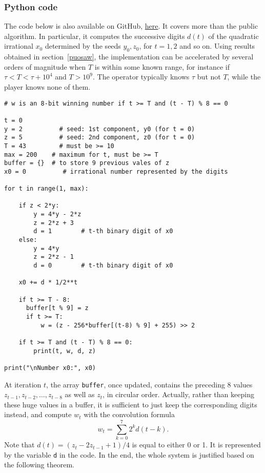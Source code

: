 \documentclass[oneside,10pt]{book}
\begin{document}
\subsubsection{Python code}\label{bornase}

The code below is also available on GitHub, \href{https://github.com/VincentGranville/Stochastic-Processes/blob/master/lottery.py}{here}.
 It covers more than the public algorithm. In particular, it computes the successive digits $d(t)$ of
 the quadratic irrational $x_0$ determined by the seeds $y_0,z_0$, for $t=1,2$ and so on.
 Using results obtained in section~\ref{puosaw}, the implementation can be accelerated by several orders of magnitude
 when $T$ is within some known range, for instance if $\tau < T < \tau +10^4$ and $T>10^9$.
The operator typically knows $\tau$ but not $T$, while the player knows none of them.
\vspace{1ex}

\begin{lstlisting}
# w is an 8-bit winning number if t >= T and (t - T) % 8 == 0

t = 0
y = 2          # seed: 1st component, y0 (for t = 0)
z = 5          # seed: 2nd component, z0 (for t = 0)
T = 43         # must be >= 10
max = 200    # maximum for t, must be >= T
buffer = {}  # to store 9 previous vales of z
x0 = 0          # irrational number represented by the digits

for t in range(1, max):

    if z < 2*y:
        y = 4*y - 2*z
        z = 2*z + 3
        d = 1        # t-th binary digit of x0
    else:
        y = 4*y
        z = 2*z - 1
        d = 0        # t-th binary digit of x0

    x0 += d * 1/2**t

    if t >= T - 8:
      buffer[t % 9] = z
      if t >= T:
          w = (z - 256*buffer[(t-8) % 9] + 255) >> 2

    if t >= T and (t - T) % 8 == 0:
        print(t, w, d, z)

print("\nNumber x0:", x0)
\end{lstlisting}
\vspace{1ex}

\noindent At iteration $t$, the array \texttt{buffer}, once updated, contains the
preceding 8 values $z_{t-1}, z_{t-2},\dots, z_{t-8}$ as well as $z_t$, in circular order. Actually, rather than keeping these huge values
 in a buffer, it is sufficient to just keep the corresponding digits instead, and compute $w_t$ with the convolution formula
$$
w_t = \sum_{k=0}^7 2^k d(t-k).
$$
Note that $d(t) = (z_t - 2z_{t-1} + 1)/4$ is equal to either 0 or 1. It is represented by the variable  \texttt{d} in the code.
In the end, the whole system is justified based on the following theorem.
\end{document}
